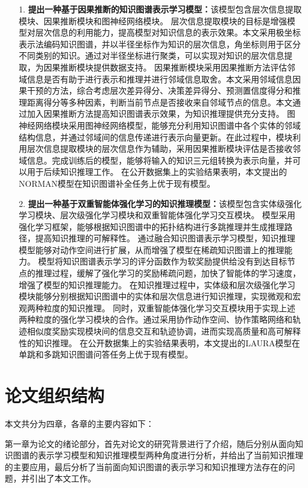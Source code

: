 \documentclass[algorithmlist, AutoFakeBold, AutoFakeSlant, figurelist, tablelist, nomlist, engineering]{seuthesix}
\begin{document}
\begin{itemize}
  \item [1.]\textbf{提出一种基于因果推断的知识图谱表示学习模型：}该模型包含层次信息提取模块、因果推断模块和图神经网络模块。
  层次信息提取模块的目标是增强模型对层次信息的利用能力，提高模型对知识信息的表示效果。本文采用极坐标表示法编码知识图谱，并以半径坐标作为知识的层次信息，角坐标则用于区分不同类别的知识。通过对半径坐标进行聚类，可以实现对知识的层次信息提取，为因果推断模块提供数据支持。
  因果推断模块采用因果推断方法评估邻域信息是否有助于进行表示和推理并进行邻域信息取舍。本文采用邻域信息因果干预的方法，综合考虑层次差异得分、决策差异得分、预测置信度得分和推理距离得分等多种因素，判断当前节点是否接收来自邻域节点的信息。本文通过加入因果推断方法提高知识图谱表示效果，为知识推理提供充分支持。
  图神经网络模块采用图神经网络模型，能够充分利用知识图谱中各个实体的邻域结构信息，并通过邻域间的信息传递进行表示向量更新。在此过程中，模块利用层次信息提取模块的层次信息作为辅助，采用因果推断模块评估是否接收邻域信息。完成训练后的模型，能够将输入的知识三元组转换为表示向量，并可以用于后续知识推理工作。
  在公开数据集上的实验结果表明，本文提出的NORMAN模型在知识图谱补全任务上优于现有模型。
  \item [2.]\textbf{提出一种基于双重智能体强化学习的知识推理模型：}该模型包含实体级强化学习模块、层次级强化学习模块和双重智能体强化学习交互模块。
  模型采用强化学习框架，能够根据知识图谱中的拓扑结构进行多跳推理并生成推理路径，提高知识推理的可解释性。
  通过融合知识图谱表示学习模型，知识推理模型能够对动作空间进行扩展，从而增强了模型在稀疏知识图谱上的推理能力。
  模型将知识图谱表示学习的评分函数作为软奖励提供给没有到达目标节点的推理过程，缓解了强化学习的奖励稀疏问题，加快了智能体的学习速度，增强了模型的知识推理能力。
  在知识推理过程中，实体级和层次级强化学习模块能够分别根据知识图谱中的实体和层次信息进行知识推理，实现微观和宏观两种粒度的知识推理。
  同时，双重智能体强化学习交互模块用于实现上述两种粒度的强化学习模块的合作。通过采用协作动作空间、协作策略网络和轨迹相似度奖励实现模块间的信息交互和轨迹协调，进而实现高质量和高可解释性的知识推理。
  在公开数据集上的实验结果表明，本文提出的LAURA模型在单跳和多跳知识图谱问答任务上优于现有模型。
\end{itemize}


\section{论文组织结构}
本文共分为四章，各章的主要内容如下：

第一章为论文的绪论部分，首先对论文的研究背景进行了介绍，随后分别从面向知识图谱的表示学习模型和知识推理模型两种角度进行分析，并给出了当前知识推理的主要应用，最后分析了当前面向知识图谱的表示学习和知识推理方法存在的问题，并引出了本文工作。
\end{document}
